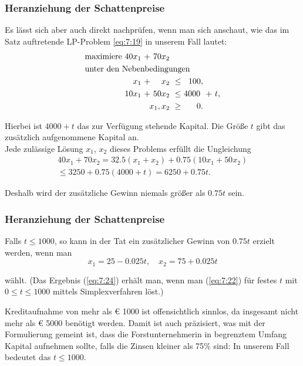 \documentclass[smaller]{beamer}
\begin{document}
\begin{frame}
 \frametitle{Heranziehung der Schattenpreise}
 Es lässt sich aber auch direkt nachprüfen, wenn man sich anschaut, wie das im Satz auftretende LP-Problem \eqref{eq:7:19} in unserem Fall lautet:
\begin{align}
\begin{alignedat}{5}
\label{eq:7:22}
& \text{maximiere } & 40x_1 &\ + &\ 70x_2 & & \\
& \rlap{unter den Nebenbedingungen} & & & & & \\
&&   x_1 &\ + &\   x_2 &\ \leq &\  100, &\   &\ \\
&& 10x_1 &\ + &\ 50x_2 &\ \leq &\ 4000\ &\ + &\ t, \\
&& & & \llap{$x_1,x_2$} &\ \geq &\   0. & &
\end{alignedat}
\end{align}

Hierbei ist $4000+t$ das zur Verfügung stehende Kapital. Die Größe $t$ gibt das zusätzlich aufgenommene Kapital an. \\ \vspace*{0.2cm}
Jede zulässige Lösung $x_1$, $x_2$ dieses Problems erfüllt die Ungleichung
\begin{multline}
\label{eq:7:23}
40x_1 + 70x_2 = 32.5 ( x_1+x_2 ) + 0.75 ( 10x_1 + 50x_2 ) \\ \leq 3250 + 0.75(4000+t) = 6250 + 0.75t.
\end{multline}

Deshalb wird der zusätzliche Gewinn niemals größer als $0.75t$ sein.
\end{frame}

\begin{frame}
 \frametitle{Heranziehung der Schattenpreise}
 Falls $t \leq 1000$, so kann in der Tat ein zusätzlicher Gewinn von $0.75t$ erzielt werden, wenn man
\begin{equation}
\label{eq:7:24}
x_1 = 25 - 0.025t,\quad
x_2 = 75 + 0.025t
\end{equation}

wählt. (Das Ergebnis (\ref{eq:7:24}) erhält man, wenn man (\ref{eq:7:22}) für festes $t$ mit $0 \leq t \leq 1000$ mittels Simplexverfahren löst.) \\ \vspace*{0.2cm}

Kreditaufnahme von mehr als {\euro} 1000 ist offensichtlich sinnlos, da insgesamt nicht mehr als {\euro} 5000 benötigt werden. \alert{Damit ist auch präzisiert, was mit der Formulierung gemeint ist, dass die Forstunternehmerin {\glqq}in begrenztem Umfang{\grqq} Kapital aufnehmen sollte, falls die Zinsen kleiner als 75\% sind:} In unserem Fall bedeutet das $t \leq 1000$.
\end{frame}
\end{document}
